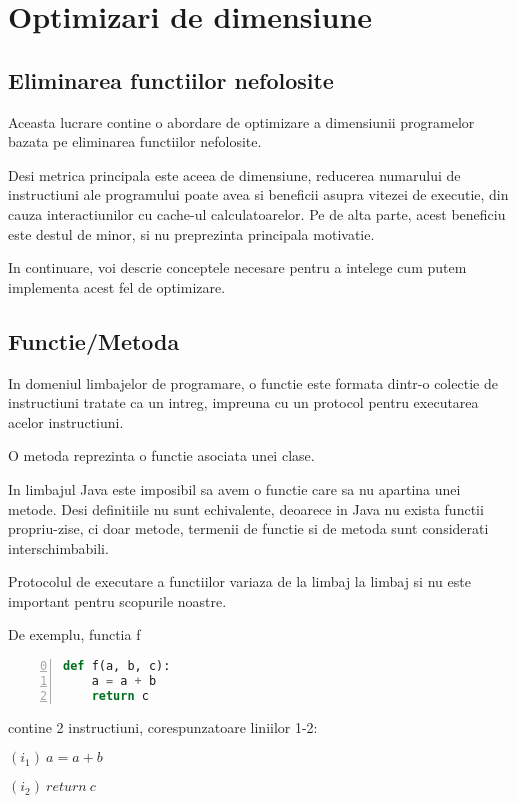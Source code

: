 \chapter{Optimizari de dimensiune}\label{capitolul_optimizari_de_dimensiune}

\section{Eliminarea functiilor nefolosite}

Aceasta lucrare contine o abordare de optimizare a dimensiunii
programelor bazata pe eliminarea functiilor nefolosite.

Desi metrica principala este aceea de dimensiune, reducerea
numarului de instructiuni ale programului poate avea si beneficii
asupra vitezei de executie, din cauza interactiunilor cu cache-ul
calculatoarelor. Pe de alta parte, acest beneficiu este destul de
minor, si nu preprezinta principala motivatie.

In continuare, voi descrie conceptele necesare pentru a intelege
cum putem implementa acest fel de optimizare.

\section{Functie/Metoda}

In domeniul limbajelor de programare, o functie  este
formata dintr-o colectie de instructiuni tratate ca un intreg,
impreuna cu un protocol pentru executarea acelor instructiuni.

O metoda  reprezinta o functie asociata unei clase.

In limbajul Java este imposibil sa avem o functie care sa nu
apartina unei metode.
Desi definitiile nu sunt echivalente, deoarece in Java nu exista
functii propriu-zise, ci doar metode, termenii de functie si de metoda
sunt considerati interschimbabili.

Protocolul de executare a functiilor variaza de la limbaj la
limbaj si nu este important pentru scopurile noastre.

De exemplu, functia f
\begin{lstlisting}[language=Python, numbers=left, firstnumber=0]
def f(a, b, c):
    a = a + b
    return c
\end{lstlisting}
contine 2 instructiuni, corespunzatoare liniilor 1-2:

$(i_1)\ a = a + b$

$(i_2)\ return\ c$

